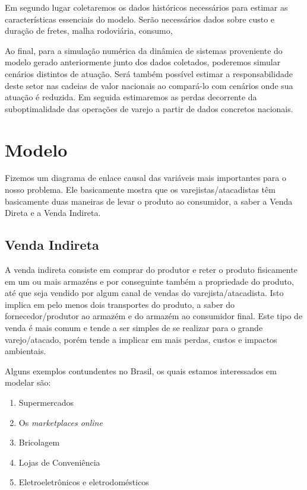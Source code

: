 \documentclass[]{article}
\begin{document}
	Em segundo lugar coletaremos os dados históricos necessários para estimar as características essenciais do modelo. Serão necessários dados sobre custo e duração de fretes, malha rodoviária, consumo, 
	
	Ao final, para a simulação numérica da dinâmica de sistemas proveniente do modelo gerado anteriormente junto dos dados coletados, poderemos simular cenários distintos de atuação. Será também possível estimar a responsabilidade deste setor nas cadeias de valor nacionais ao compará-lo com cenários onde sua atuação é reduzida. Em seguida estimaremos as perdas decorrente da suboptimalidade das operações de varejo a partir de dados concretos nacionais.
	
	
	
	\section{Modelo}
	
	
	Fizemos um diagrama de enlace causal das variáveis mais importantes para o nosso problema. Ele basicamente mostra que os varejistas/atacadistas têm basicamente duas maneiras de levar o produto ao consumidor, a saber a Venda Direta e a Venda Indireta. 
	
	
	\subsection{Venda Indireta}
	
	
	
	
	A venda indireta consiste em comprar do produtor e reter o produto fisicamente em um ou mais armazéns e por conseguinte também a propriedade do produto, até que seja vendido por algum canal de vendas do varejista/atacadista. Isto implica em pelo menos dois transportes do produto, a saber do fornecedor/produtor ao armazém e do armazém ao consumidor final. Este tipo de venda é mais comum e tende a ser simples de se realizar para o grande varejo/atacado, porém tende a implicar em mais perdas, custos e impactos ambientais.
	
	Alguns exemplos contundentes no Brasil, os quais estamos interessados em modelar são: 
	
	\begin{enumerate}
		\item Supermercados
		\item Os \textit{marketplaces online}
		\item Bricolagem
		\item Lojas de Conveniência
		\item Eletroeletrônicos e eletrodomésticos 
	\end{enumerate}
	
\end{document}

